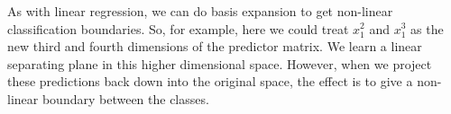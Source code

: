 \documentclass[xetex,mathserif,serif,aspectratio=169]{beamer}
\begin{document}
{
\begin{frame}[plain]
\end{frame}
}

\begin{frame}[fragile] \frametitle{} \oldB \small

\textbf{}

As with linear regression, we can do basis expansion to get non-linear classification
boundaries. So, for example, here we could treat $x_1^2$ and $x_1^3$ as the new third
and fourth dimensions of the predictor matrix. We learn a linear separating plane in
this higher dimensional space. However, when we project these predictions back down
into the original space, the effect is to give a non-linear boundary between the classes.

\end{frame}
\end{document}
